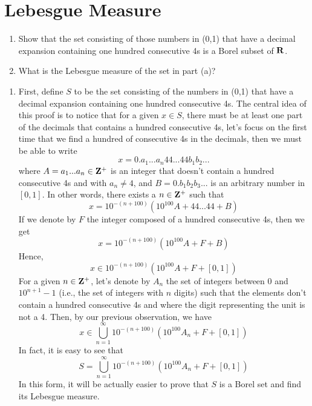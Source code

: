 \section{Lebesgue Measure}

\begin{exercise}
    \nobreak
    \begin{enumerate}[label=(\alph*)]
        \item Show that the set consisting of those numbers in (0,1) that have a decimal expansion containing one hundred consecutive 4s is a Borel subset of $\mathbf{R}$.
        \item What is the Lebesgue measure of the set in part (a)? \\
    \end{enumerate}
\end{exercise}

\begin{solution}
    \begin{enumerate}[label=(\alph*)]
        \item First, define $S$ to be the set consisting of the numbers in (0,1) that have a decimal expansion containing one hundred consecutive 4s. The central idea of this proof is to notice that for a given $x \in S$, there must be at least one part of the decimals that contains a hundred consecutive 4s, let's focus on the first time that we find a hundred of consecutive 4s in the decimals, then we must be able to write
        $$x = 0.a_1...a_n 4 4 ... 4 4 b_1 b_2 ...$$
        where  $A = a_1 ... a_n \in \mathbf{Z}^+$ is an integer that doesn't contain a hundred consecutive 4s and with $a_n \neq 4$, and $B = 0.b_1b_2b_3... $ is an arbitrary number in $[0,1]$. In other words, there exists a $n \in \mathbf{Z}^+$ such that
        $$x = 10^{-(n+100)}(10^{100}A + 44...44 + B)$$
        If we denote by $F$ the integer composed of a hundred consecutive 4s, then we get
        $$x = 10^{-(n+100)}(10^{100}A + F + B)$$
        Hence,
        $$x \in 10^{-(n+100)}(10^{100}A + F + [0,1])$$
        For a given $n \in \mathbf{Z}^+$, let's denote by $A_n$ the set of integers between 0 and $10^{n+1}-1$ (i.e., the set of integers with $n$ digits) such that the elements don't contain a hundred consecutive 4s and where the digit representing the unit is not a 4. Then, by our previous observation, we have
        $$x \in \bigcup_{n = 1}^{\infty}10^{-(n+100)}(10^{100}A_n + F + [0,1])$$
        In fact, it is easy to see that
        $$S = \bigcup_{n = 1}^{\infty}10^{-(n+100)}(10^{100}A_n + F + [0,1])$$
        In this form, it will be actually easier to prove that $S$ is a Borel set and find its Lebesgue measure.
    \end{enumerate}
\end{solution}